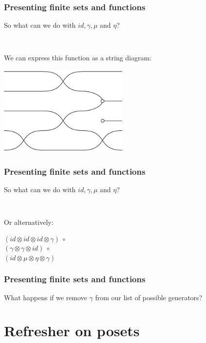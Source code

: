 \documentclass[t, pdftex]{beamer}
\begin{document}
\begin{frame}
    \frametitle{Presenting finite sets and functions}
    So what can we do with $id, \gamma, \mu$ and $\eta$?
    \par \ 
    \par
    We can express this function as a string diagram:
    \begin{center}
        \includegraphics[height=4.5cm,keepaspectratio]{figures/dia2.pdf}
    \end{center}

\end{frame}


\begin{frame}
    \frametitle{Presenting finite sets and functions}
    So what can we do with $id, \gamma, \mu$ and $\eta$?
    \par \ 
    \par
    Or alternatively:
    \begin{center}
        $(id \otimes id \otimes id \otimes \gamma)\ \circ$\\
        $(\gamma \otimes \gamma \otimes id)\ \circ$\\
        $(id \otimes \mu \otimes \eta \otimes \gamma)$
    \end{center}

\end{frame}

\begin{frame}
    \frametitle{Presenting finite sets and functions}
    
    \begin{center}
        What happens if we remove $\gamma$ from our list of possible generators?
    \end{center}

\end{frame}


\section{Refresher on posets}
\end{document}
